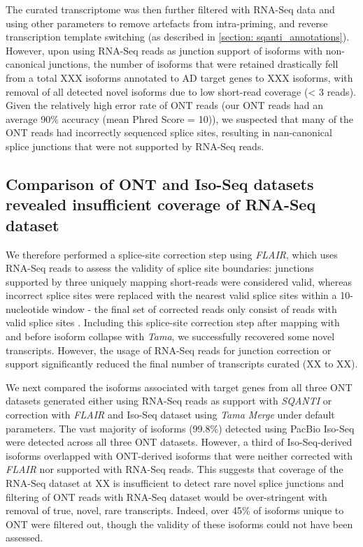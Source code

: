 The curated transcriptome was then further filtered with RNA-Seq data and using other parameters to remove artefacts from intra-priming, and reverse transcription template switching (as described in \cref{section: sqanti_annotations}). However, upon using RNA-Seq reads as junction support of isoforms with non-canonical junctions, the number of isoforms that were retained drastically fell from a total XXX isoforms annotated to AD target genes to XXX isoforms, with removal of all detected novel isoforms due to low short-read coverage (< 3 reads). Given the relatively high error rate of ONT reads (our ONT reads had an average 90\% accuracy (mean Phred Score = 10)), we suspected that many of the ONT reads had incorrectly sequenced splice sites, resulting in nan-canonical splice junctions that were not supported by RNA-Seq reads.


\subsection{Comparison of ONT and Iso-Seq datasets revealed insufficient coverage of RNA-Seq dataset}
We therefore performed a splice-site correction step using \textit{FLAIR}\cite{Tang2020}, which uses RNA-Seq reads to assess the validity of splice site boundaries: junctions supported by three uniquely mapping short-reads were considered valid, whereas incorrect splice sites were replaced with the nearest valid splice sites within a 10-nucleotide window - the final set of corrected reads only consist of reads with valid splice sites \cite{Tang2020}. Including this splice-site correction step after mapping with  and before isoform collapse with \textit{Tama}, we successfully recovered some novel transcripts. However, the usage of RNA-Seq reads for junction correction or support significantly reduced the final number of transcripts curated (XX to XX). 

We next compared the isoforms associated with target genes from all three ONT datasets generated either using RNA-Seq reads as support with \textit{SQANTI} or correction with \textit{FLAIR} and Iso-Seq dataset using \textit{Tama Merge} under default parameters. The vast majority of isoforms (99.8\%) detected using PacBio Iso-Seq were detected across all three ONT datasets. However, a third of Iso-Seq-derived isoforms overlapped with ONT-derived isoforms that were neither corrected with \textit{FLAIR} nor supported with RNA-Seq reads. This suggests that coverage of the RNA-Seq dataset at XX is insufficient to detect rare novel splice junctions and filtering of ONT reads with RNA-Seq dataset would be over-stringent with removal of true, novel, rare transcripts. Indeed, over 45\% of isoforms unique to ONT were filtered out, though the validity of these isoforms could not have been assessed. 


